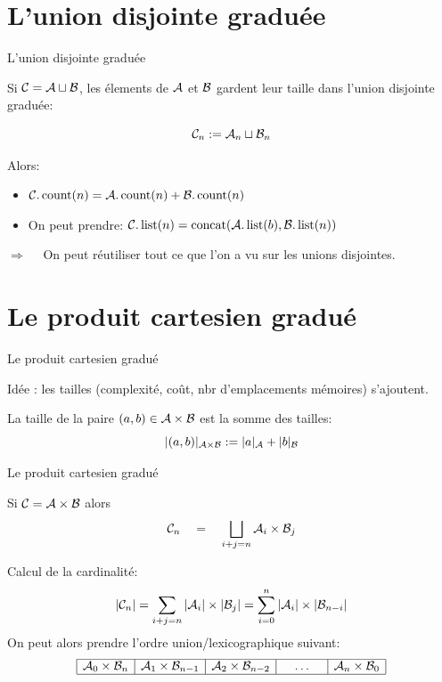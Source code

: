 \documentclass{beamer}
\begin{document}
\section{L'union disjointe graduée}
\begin{frame}{L'union disjointe graduée}

  Si $\mathcal{C} = \mathcal{A} \sqcup \mathcal{B}$, les élements de $\mathcal{A}$ et $\mathcal{B}$ gardent leur
  taille dans l'union disjointe graduée:

  \[\mathcal{C}_n := \mathcal{A}_n \sqcup \mathcal{B}_n\]

  Alors:
  \begin{itemize}
  \item $\mathcal{C}.\operatorname{count}(n) = \mathcal{A}.\operatorname{count}(n) + \mathcal{B}.\operatorname{count}(n)$
  \item On peut prendre: $\mathcal{C}.\operatorname{list}(n) = \operatorname{concat}(\mathcal{A}.\operatorname{list}(b), \mathcal{B}.\operatorname{list}(n))$
  \end{itemize}
  \bigskip\pause

  $\Longrightarrow\quad$ On peut réutiliser tout ce que l'on a vu sur les
  unions disjointes.
\end{frame}

\section{Le produit cartesien gradué}
\begin{frame}{Le produit cartesien gradué}

  Idée : les tailles (complexité, coût, nbr d'emplacements mémoires)
  s'ajoutent.
  \bigskip
  \begin{definition}
    La taille de la paire $(a, b)\in \mathcal{A}\times \mathcal{B}$ est la somme des tailles:
    \[|(a, b)|_{\mathcal{A}\times\mathcal{B}} := |a|_{\mathcal{A}} + |b|_{\mathcal{B}}\]
  \end{definition}
\end{frame}

\begin{frame}{Le produit cartesien gradué}

  \begin{NOTE}
    Si $\mathcal{C} = \mathcal{A} \times \mathcal{B}$ alors
    \[
    \mathcal{C}_n\quad=\quad\bigsqcup_{i+j=n}  \mathcal{A}_i \times \mathcal{B}_j
    \]
  \end{NOTE}
  \bigskip\pause

  Calcul de la cardinalité:
  \[
  |\mathcal{C}_n| = \sum_{i+j=n}  |\mathcal{A}_i| \times |\mathcal{B}_j| = 
          \sum_{i=0}^{n}  |\mathcal{A}_i| \times |\mathcal{B}_{n-i}|
  \]
  On peut alors prendre l'ordre union/lexicographique suivant:
  \[
  \begin{array}{|c|c|c|c|c|c|}
    \hline
    \mathcal{A}_0\times \mathcal{B}_n &     \mathcal{A}_1\times \mathcal{B}_{n-1} &  \mathcal{A}_2\times \mathcal{B}_{n-2} &  
    \quad\dots\quad &
    \mathcal{A}_{n}\times \mathcal{B}_{0}
    \\ \hline
  \end{array}
  \]

\end{frame}
\end{document}
